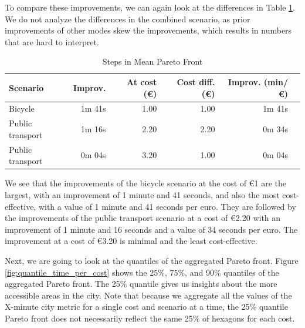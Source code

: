 To compare these improvements, we can again look at the differences in Table \ref{tab:differences_in_mean_pareto_front}.
We do not analyze the differences in the combined scenario, as prior improvements of other modes skew the improvements, which results in numbers that are hard to interpret.

\begin{table}
  \caption{Steps in Mean Pareto Front}
  \label{tab:differences_in_mean_pareto_front}
  \begin{center}
    \begin{tabular}{|l|r|r|r|r|l|}
     \hline
     Scenario & Improv. & At cost (\euro) & Cost diff. (\euro) & Improv. (min/\euro) \\
     \hline
     Bicycle & 1m 41s & 1.00 & 1.00 & 1m 41s \\
     \hline
     Public transport & 1m 16s & 2.20 & 2.20 & 0m 34s \\
     \hline
     Public transport & 0m 04s & 3.20 & 1.00 & 0m 04s \\
     \hline
    \end{tabular}
  \end{center}
\end{table}

We see that the improvements of the bicycle scenario at the cost of \euro{1} are the largest, with an improvement of 1 minute and 41 seconds, and also the most cost-effective, with a value of 1 minute and 41 seconds per euro.
They are followed by the improvements of the public transport scenario at a cost of \euro{2.20} with an improvement of 1 minute and 16 seconds and a value of 34 seconds per euro.
The improvement at a cost of \euro{3.20} is minimal and the least cost-effective.

Next, we are going to look at the quantiles of the aggregated Pareto front.
Figure \ref{fig:quantile_time_per_cost} shows the 25\%, 75\%, and 90\% quantiles of the aggregated Pareto front.
The 25\% quantile gives us insights about the more accessible areas in the city.
Note that because we aggregate all the values of the X-minute city metric for a single cost and scenario at a time, the 25\% quantile Pareto front does not necessarily reflect the same 25\% of hexagons for each cost.

